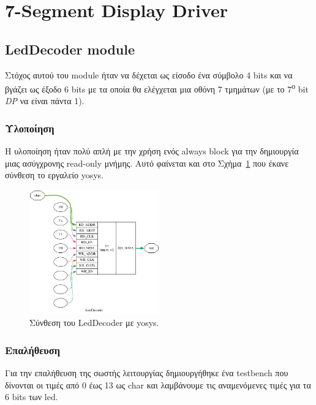 \documentclass[../main.tex]{subfiles}
\begin{document}
\section{7-Segment Display Driver}

\subsection{LedDecoder module}

Στόχος αυτού του module ήταν να δέχεται ως είσοδο ένα σύμβολο 4 bits και να
βγάζει ως έξοδο 6 bits με τα οποία θα ελέγχεται μια οθόνη 7 τμημάτων (με το
7\textsuperscript{ο} bit \textit{DP} να είναι πάντα 1). 

\subsubsection*{Υλοποίηση}

Η υλοποίηση ήταν πολύ απλή με την χρήση ενός always block για την δημιουργία
μιας ασύγχρονης read-only μνήμης. Αυτό φαίνεται και στο
Σχήμα~\ref{fig:module_led_decoder} που έκανε σύνθεση το εργαλείο yosys.

\begin{figure}[H]
  \begin{center}
    \includegraphics[width=0.5\textwidth]{../../diagrams/LedDecoder.png}
  \end{center}
  \caption{Σύνθεση του LedDecoder με yosys.}
  \label{fig:module_led_decoder}
\end{figure}

\subsubsection*{Επαλήθευση}
Για την επαλήθευση της σωστής λειτουργίας δημιουργήθηκε ένα testbench που
δίνονται οι τιμές από 0 έως 13 ως char και λαμβάνουμε τις αναμενόμενες τιμές
για τα 6 bits των led.
\end{document}
